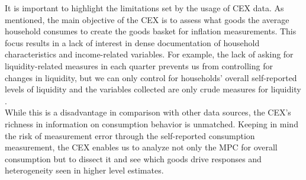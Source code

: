 It is important to highlight the limitations set by the usage of CEX data. As mentioned, the main objective of the CEX is to assess what goods the average household consumes to create the goods basket for inflation measurements. This focus results in a lack of interest in dense documentation of household characteristics and income-related variables. For example, the lack of asking for liquidity-related measures in each quarter prevents us from controlling for changes in liquidity, but we can only control for households' overall self-reported levels of liquidity and the variables collected are only crude measures for liquidity \citep{parkeretal_2013}. \\
While this is a disadvantage in comparison with other data sources, the CEX's richness in information on consumption behavior is unmatched. Keeping in mind the risk of measurement error through the self-reported consumption measurement, the CEX enables us to analyze not only the MPC for overall consumption but to dissect it and see which goods drive responses and heterogeneity seen in higher level estimates.